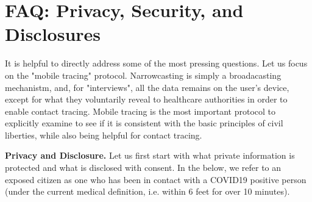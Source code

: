 \documentclass{article}
\begin{document}
\section{FAQ: Privacy, Security, and Disclosures} 

It is helpful to directly address some of the most pressing questions. Let us focus on the "mobile tracing" protocol. 
Narrowcasting is simply a broadacasting mechanistm, and, for "interviews", all the data remains on the user's device, except for what they voluntarily reveal to healthcare authorities in order to enable contact tracing.  Mobile tracing is the most important protocol to explicitly examine to see if it is consistent with the basic principles of civil liberties, while also being helpful for contact tracing.

\textbf{Privacy and Disclosure.} Let us first start with what private information is protected and what is disclosed with consent. In the below, we refer to an exposed citizen as one who has been in contact with a COVID19 positive person (under the current medical definition, i.e. within 6 feet for over 10 minutes).


\end{document}
